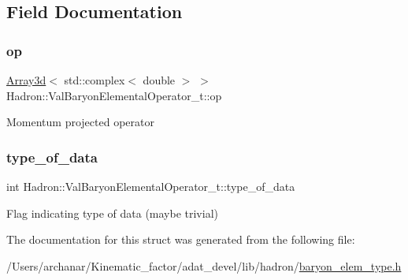 \subsection{Field Documentation}
\mbox{\label{structHadron_1_1ValBaryonElementalOperator__t_aeb438473276ebd527b1d6a1c72d0630d}} 
\subsubsection{\texorpdfstring{op}{op}}
{\footnotesize\ttfamily \mbox{\hyperlink{classXMLArray_1_1Array3d}{Array3d}}$<$ std\+::complex$<$ double $>$ $>$ Hadron\+::\+Val\+Baryon\+Elemental\+Operator\+\_\+t\+::op}

Momentum projected operator \mbox{\label{structHadron_1_1ValBaryonElementalOperator__t_acd2ecc17e571292524c3fc8a1eedc605}} 
\subsubsection{\texorpdfstring{type\_of\_data}{type\_of\_data}}
{\footnotesize\ttfamily int Hadron\+::\+Val\+Baryon\+Elemental\+Operator\+\_\+t\+::type\+\_\+of\+\_\+data}

Flag indicating type of data (maybe trivial) 

The documentation for this struct was generated from the following file\+:\begin{DoxyCompactItemize}
\item 
/\+Users/archanar/\+Kinematic\+\_\+factor/adat\+\_\+devel/lib/hadron/\mbox{\hyperlink{lib_2hadron_2baryon__elem__type_8h}{baryon\+\_\+elem\+\_\+type.\+h}}\end{DoxyCompactItemize}
